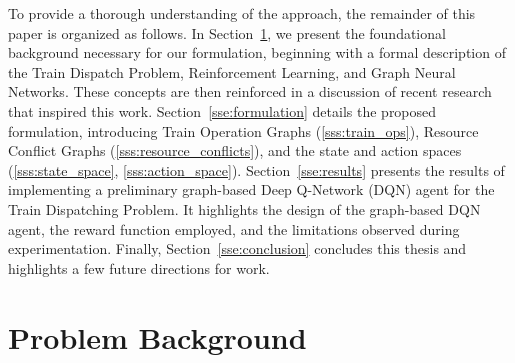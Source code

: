 \documentclass[runningheads]{llncs}
\begin{document}
To provide a thorough understanding of the approach, the remainder of this paper is organized as follows. 
In Section~\ref{sse:background}, we present the foundational background necessary for our formulation, beginning with a formal description of the Train Dispatch Problem, Reinforcement Learning, and Graph Neural Networks.
These concepts are then reinforced in a discussion of recent research that inspired this work.
Section~\ref{sse:formulation} details the proposed formulation, introducing Train Operation Graphs (\ref{sss:train_ops}), Resource Conflict Graphs (\ref{sss:resource_conflicts}), and the state and action spaces (\ref{sss:state_space}, \ref{sss:action_space}). 
Section~\ref{sse:results} presents the results of implementing a preliminary graph-based Deep Q-Network (DQN) agent for the Train Dispatching Problem. 
It highlights the design of the graph-based DQN agent, the reward function employed, and the limitations observed during experimentation.
Finally, Section~\ref{sse:conclusion} concludes this thesis and highlights a few future directions for work.



\section{Problem Background}
\label{sse:background}
\end{document}

